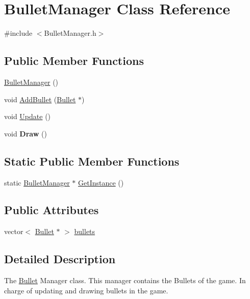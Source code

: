 \hypertarget{class_bullet_manager}{}\section{Bullet\+Manager Class Reference}
\label{class_bullet_manager}


{\ttfamily \#include $<$Bullet\+Manager.\+h$>$}

\subsection*{Public Member Functions}
\begin{DoxyCompactItemize}
\item 
\hyperlink{class_bullet_manager_a4aae3d492898b93dd5730dc28f2cc910}{Bullet\+Manager} ()
\item 
void \hyperlink{class_bullet_manager_a26b49b882e3e99a170c1bfb64049e615}{Add\+Bullet} (\hyperlink{class_bullet}{Bullet} $\ast$)
\item 
void \hyperlink{class_bullet_manager_a321c590e7fb717b27ef6273eb6ec0495}{Update} ()
\item 
void {\bfseries Draw} ()\hypertarget{class_bullet_manager_af861af018a598aaa613ff7ad6ad904e3}{}\label{class_bullet_manager_af861af018a598aaa613ff7ad6ad904e3}

\end{DoxyCompactItemize}
\subsection*{Static Public Member Functions}
\begin{DoxyCompactItemize}
\item 
static \hyperlink{class_bullet_manager}{Bullet\+Manager} $\ast$ \hyperlink{class_bullet_manager_aec024d08c1c6c5ff738823f0a4de2783}{Get\+Instance} ()
\end{DoxyCompactItemize}
\subsection*{Public Attributes}
\begin{DoxyCompactItemize}
\item 
vector$<$ \hyperlink{class_bullet}{Bullet} $\ast$ $>$ \hyperlink{class_bullet_manager_a1968fcc88d5fb374e30f7cdb8497f62f}{bullets}
\end{DoxyCompactItemize}


\subsection{Detailed Description}
The \hyperlink{class_bullet}{Bullet} Manager class. This manager contains the Bullets of the game. In charge of updating and drawing bullets in the game. 

